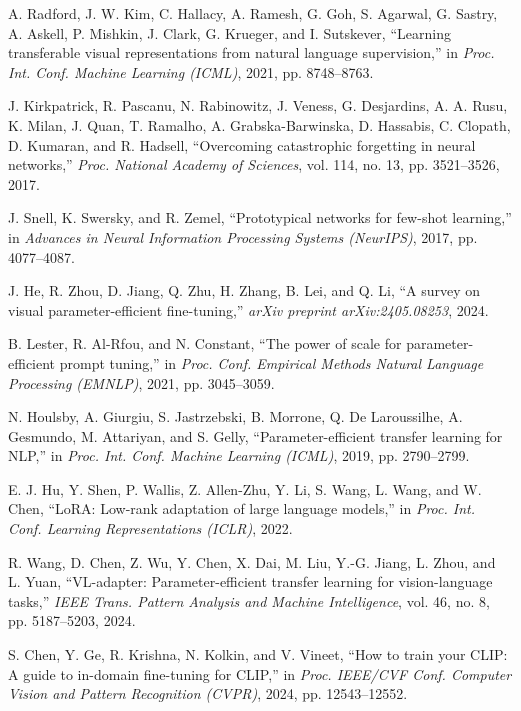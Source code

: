 \documentclass[conference]{IEEEtran}
\begin{document}
\begin{thebibliography}{99}

A. Radford, J. W. Kim, C. Hallacy, A. Ramesh, G. Goh, S. Agarwal, G. Sastry, A. Askell, P. Mishkin, J. Clark, G. Krueger, and I. Sutskever, ``Learning transferable visual representations from natural language supervision,'' in \textit{Proc. Int. Conf. Machine Learning (ICML)}, 2021, pp. 8748--8763.

J. Kirkpatrick, R. Pascanu, N. Rabinowitz, J. Veness, G. Desjardins, A. A. Rusu, K. Milan, J. Quan, T. Ramalho, A. Grabska-Barwinska, D. Hassabis, C. Clopath, D. Kumaran, and R. Hadsell, ``Overcoming catastrophic forgetting in neural networks,'' \textit{Proc. National Academy of Sciences}, vol. 114, no. 13, pp. 3521--3526, 2017.

J. Snell, K. Swersky, and R. Zemel, ``Prototypical networks for few-shot learning,'' in \textit{Advances in Neural Information Processing Systems (NeurIPS)}, 2017, pp. 4077--4087.

J. He, R. Zhou, D. Jiang, Q. Zhu, H. Zhang, B. Lei, and Q. Li, ``A survey on visual parameter-efficient fine-tuning,'' \textit{arXiv preprint arXiv:2405.08253}, 2024.

B. Lester, R. Al-Rfou, and N. Constant, ``The power of scale for parameter-efficient prompt tuning,'' in \textit{Proc. Conf. Empirical Methods Natural Language Processing (EMNLP)}, 2021, pp. 3045--3059.

N. Houlsby, A. Giurgiu, S. Jastrzebski, B. Morrone, Q. De Laroussilhe, A. Gesmundo, M. Attariyan, and S. Gelly, ``Parameter-efficient transfer learning for NLP,'' in \textit{Proc. Int. Conf. Machine Learning (ICML)}, 2019, pp. 2790--2799.

E. J. Hu, Y. Shen, P. Wallis, Z. Allen-Zhu, Y. Li, S. Wang, L. Wang, and W. Chen, ``LoRA: Low-rank adaptation of large language models,'' in \textit{Proc. Int. Conf. Learning Representations (ICLR)}, 2022.

R. Wang, D. Chen, Z. Wu, Y. Chen, X. Dai, M. Liu, Y.-G. Jiang, L. Zhou, and L. Yuan, ``VL-adapter: Parameter-efficient transfer learning for vision-language tasks,'' \textit{IEEE Trans. Pattern Analysis and Machine Intelligence}, vol. 46, no. 8, pp. 5187--5203, 2024.

S. Chen, Y. Ge, R. Krishna, N. Kolkin, and V. Vineet, ``How to train your CLIP: A guide to in-domain fine-tuning for CLIP,'' in \textit{Proc. IEEE/CVF Conf. Computer Vision and Pattern Recognition (CVPR)}, 2024, pp. 12543--12552.


\end{thebibliography}
\end{document}
